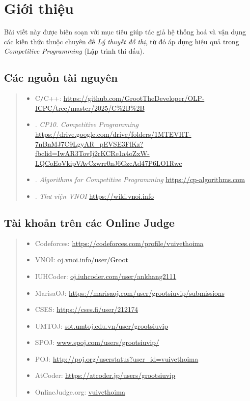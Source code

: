 \chapter{Giới thiệu}
\minitoc 

Bài viết này được biên soạn với mục tiêu giúp tác giả hệ thống hoá và vận dụng các kiến thức thuộc chuyên đề \textit{Lý thuyết đồ thị}, từ đó áp dụng hiệu quả trong \textit{Competitive Programming} (Lập trình thi đấu).

\section{Các nguồn tài nguyên}
\begin{quote}
    \begin{itemize}
        \item C{\tt/}C++: \url{https://github.com/GrootTheDeveloper/OLP-ICPC/tree/master/2025/C%2B%2B}
        \item \cite{CP10}. \textit{CP10. Competitive Programming} \url{https://drive.google.com/drive/folders/1MTEVHT-7nBnMJ7C9LgyAR_pEVSE3FlKz?fbclid=IwAR3TovIj2rKCRe1a4oZxW-LQCoEoVkipVAvCzwrr0nJ6GzcAd47P6LO1Rwc}
	
        \item \cite{cp-algorithms}. \textit{Algorithms for Competitive Programming} \url{https://cp-algorithms.com}

        \item \cite{VNOI-WIKI}. \textit{Thư viện VNOI} \url{https://wiki.vnoi.info}
    \end{itemize}
\end{quote}

\section{Tài khoản trên các Online Judge}
\begin{quote}
    \begin{itemize}
        \item Codeforces: \url{https://codeforces.com/profile/vuivethoima}
        \item VNOI: \url{oj.vnoi.info/user/Groot}
        \item IUHCoder: \url{oj.iuhcoder.com/user/ankhang2111}
        \item MarisaOJ: \url{https://marisaoj.com/user/grootsiuvip/submissions}
        \item CSES: \url{https://cses.fi/user/212174}
        \item UMTOJ: \url{sot.umtoj.edu.vn/user/grootsiuvip}
        \item SPOJ: \url{www.spoj.com/users/grootsiuvip/}
        \item POJ: \url{http://poj.org/userstatus?user_id=vuivethoima}
        \item AtCoder: \url{https://atcoder.jp/users/grootsiuvip}
        \item OnlineJudge.org: \url{vuivethoima}
    \end{itemize}
\end{quote}

